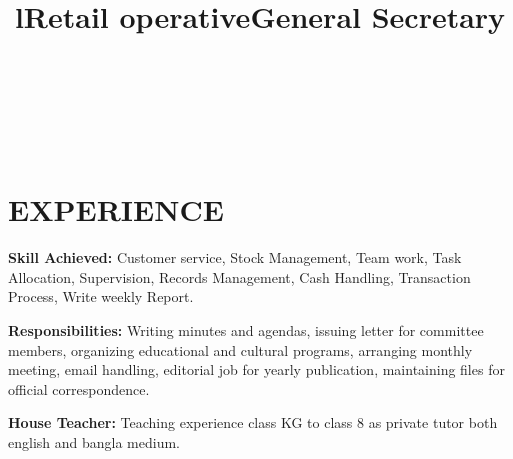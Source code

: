 \documentclass[margin]{res}
\begin{document}
\begin{resume}


\begin{format}
\title{l}\\
\\
\body\\
\end{format}

\section{EXPERIENCE}

\title{\textbf{Retail operative}}
\begin{position}
\textbf{Skill Achieved:}
Customer service, Stock Management, Team work, Task Allocation, Supervision, Records Management, Cash Handling, Transaction Process, Write weekly Report.
\end{position}

\title{\textbf{General Secretary}}
\begin{position}
\textbf{Responsibilities:}
Writing minutes and agendas, issuing letter for committee members, organizing educational and cultural programs, arranging monthly meeting, email handling, editorial job for yearly publication, maintaining files for official correspondence.
\end{position}

\textbf{House Teacher:} Teaching experience class KG to class 8 as private tutor both english and bangla medium.

  

\end{resume}
\end{document}
